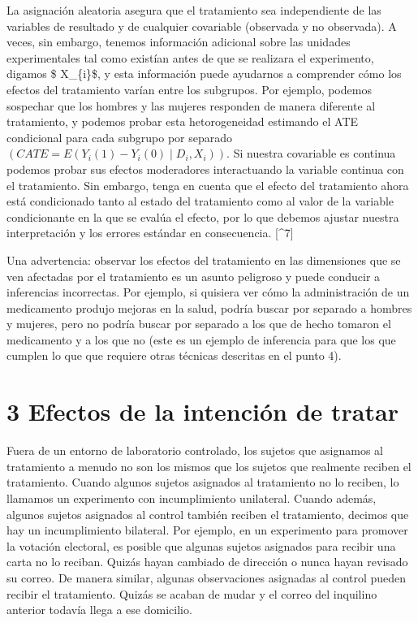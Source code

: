 \documentclass[
]{article}
\begin{document}
La asignación aleatoria asegura que el tratamiento sea independiente de
las variables de resultado y de cualquier covariable (observada y no
observada). A veces, sin embargo, tenemos información adicional sobre
las unidades experimentales tal como existían antes de que se realizara
el experimento, digamos \$ X\_\{i\}\$, y esta información puede
ayudarnos a comprender cómo los efectos del tratamiento varían entre los
subgrupos. Por ejemplo, podemos sospechar que los hombres y las mujeres
responden de manera diferente al tratamiento, y podemos probar esta
hetorogeneidad estimando el ATE condicional para cada subgrupo por
separado \((CATE = E (Y_{i} (1) −Y_{i} (0)∣D_ {i}, X_{i}))\). Si nuestra
covariable es continua podemos probar sus efectos moderadores
interactuando la variable continua con el tratamiento. Sin embargo,
tenga en cuenta que el efecto del tratamiento ahora está condicionado
tanto al estado del tratamiento como al valor de la variable
condicionante en la que se evalúa el efecto, por lo que debemos ajustar
nuestra interpretación y los errores estándar en consecuencia.
{[}\^{}7{]}

Una advertencia: observar los efectos del tratamiento en las dimensiones
que se ven afectadas por el tratamiento es un asunto peligroso y puede
conducir a inferencias incorrectas. Por ejemplo, si quisiera ver cómo la
administración de un medicamento produjo mejoras en la salud, podría
buscar por separado a hombres y mujeres, pero no podría buscar por
separado a los que de hecho tomaron el medicamento y a los que no (este
es un ejemplo de inferencia para que los que cumplen lo que que requiere
otras técnicas descritas en el punto 4).

\hypertarget{efectos-de-la-intenciuxf3n-de-tratar}{%
\section{3 Efectos de la intención de
tratar}\label{efectos-de-la-intenciuxf3n-de-tratar}}

Fuera de un entorno de laboratorio controlado, los sujetos que asignamos
al tratamiento a menudo no son los mismos que los sujetos que realmente
reciben el tratamiento. Cuando algunos sujetos asignados al tratamiento
no lo reciben, lo llamamos un experimento con incumplimiento unilateral.
Cuando además, algunos sujetos asignados al control también reciben el
tratamiento, decimos que hay un incumplimiento bilateral. Por ejemplo,
en un experimento para promover la votación electoral, es posible que
algunas sujetos asignados para recibir una carta no lo reciban. Quizás
hayan cambiado de dirección o nunca hayan revisado su correo. De manera
similar, algunas observaciones asignadas al control pueden recibir el
tratamiento. Quizás se acaban de mudar y el correo del inquilino
anterior todavía llega a ese domicilio.
\end{document}
